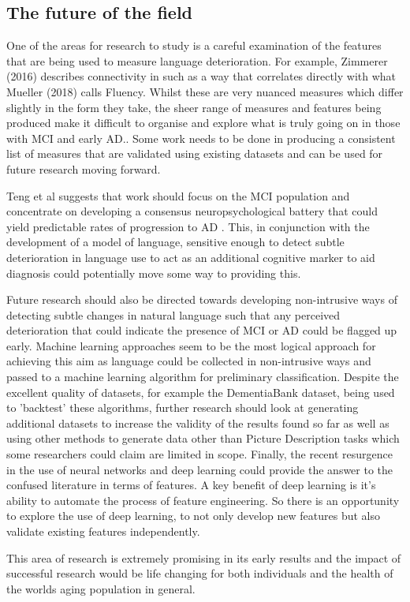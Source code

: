 \documentclass[12pt]{article}
\begin{document}
\subsection{The future of the field}
One of the areas for research to study is a careful examination of the features that are being used to measure language deterioration. For example, Zimmerer (2016) \cite{Zimmerer2016} describes connectivity in such as a way that correlates directly with what Mueller (2018) \cite{Mueller2018a} calls Fluency. Whilst these are very nuanced measures which differ slightly in the form they take, the sheer range of measures and features being produced make it difficult to organise and explore what is truly going on in those with MCI and early AD.. Some work needs to be done in producing a consistent list of measures that are validated using existing datasets and can be used for future research moving forward. \newline
\par
Teng et al suggests that work should focus on the MCI population and concentrate on developing a consensus neuropsychological battery that could yield predictable rates of progression to AD \cite{Teng2009}. This, in conjunction with the development of a model of language, sensitive enough to detect subtle deterioration in language use to act as an additional cognitive marker to aid diagnosis could potentially move some way to providing this.
\par 
Future research should also be directed towards developing non-intrusive ways of detecting subtle changes in natural language such that any perceived deterioration that could indicate the presence of MCI or AD could be flagged up early. Machine learning approaches seem to be the most logical approach for achieving this aim as language could be collected in non-intrusive ways and passed to a machine learning algorithm for preliminary classification.  Despite the excellent quality of datasets, for example the DementiaBank dataset, being used to 'backtest' these algorithms, further research should look at generating additional datasets to increase the validity of the results found so far as well as using other methods to generate data other than Picture Description tasks which some researchers could claim are limited in scope. Finally, the recent resurgence in the use of neural networks and deep learning could provide the answer to the confused literature in terms of features. A key benefit of deep learning is it's ability to automate the process of feature engineering. So there is an opportunity to explore the use of deep learning, to not only develop new features but also validate existing features independently.  
\par
This area of research is extremely promising in its early results and the impact of successful research would be life changing for both individuals and the health of the worlds aging population in general.
\end{document}
